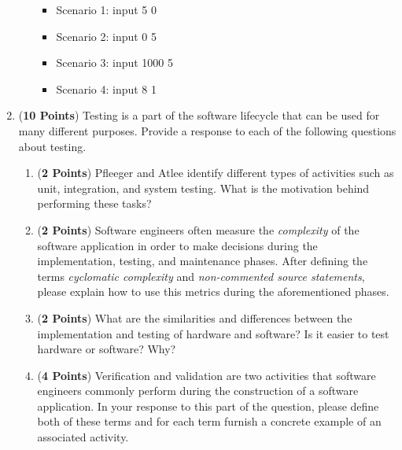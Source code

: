 \documentclass[12pt,epsf,psfig,graphics]{article}
\begin{document}
\begin{enumerate}
\begin{enumerate}

\begin{itemize}

\item Scenario 1: input 5 0
\item Scenario 2: input 0 5
\item Scenario 3: input 1000 5
\item Scenario 4: input 8 1

\end{itemize}

\end{enumerate}

\newpage

\item ({\bf 10 Points}) Testing is a part of the software lifecycle
  that can be used for many different purposes.  Provide a response 
  to each of the following questions about testing.

\begin{enumerate}       
  
\item ({\bf 2 Points}) Pfleeger and Atlee identify different types of
  activities such as unit, integration, and system testing.  What is
  the motivation behind performing these tasks?


\item ({\bf 2 Points}) Software engineers often measure the {\em
  complexity} of the software application in order to make decisions
  during the implementation, testing, and maintenance phases.  After
  defining the terms {\em cyclomatic complexity} and {\em
    non-commented source statements}, please explain how to use this
  metrics during the aforementioned phases.
  
\item ({\bf 2 Points}) What are the similarities and differences
  between the implementation and testing of hardware and software?  Is
  it easier to test hardware or software?  Why?

\item ({\bf 4 Points}) Verification and validation are two activities
  that software engineers commonly perform during the construction of
  a software application.  In your response to this part of the
  question, please define both of these terms and for each term
  furnish a concrete example of an associated activity.
  

\end{enumerate}
\end{enumerate}
\end{document}

